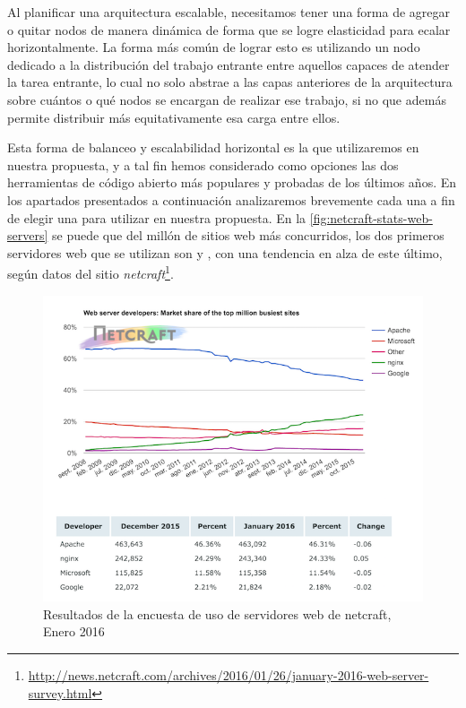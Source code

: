 Al planificar una arquitectura escalable, necesitamos tener una forma de agregar o quitar nodos de manera dinámica de forma que se logre elasticidad para ecalar horizontalmente. La forma más común de lograr esto es utilizando un nodo dedicado a la distribución del trabajo entrante entre aquellos capaces de atender la tarea entrante, lo cual no solo abstrae a las capas anteriores de la arquitectura sobre cuántos o qué nodos se encargan de realizar ese trabajo, si no que además permite distribuir más equitativamente esa carga entre ellos.

Esta forma de balanceo y escalabilidad horizontal es la que utilizaremos en nuestra propuesta, y a tal fin hemos considerado como opciones las dos herramientas de código abierto más populares y probadas de los últimos años. En los apartados presentados a continuación analizaremos brevemente cada una a fin de elegir una para utilizar en nuestra propuesta. En la \autoref{fig:netcraft-stats-web-servers} se puede que del millón de sitios web más concurridos, los dos primeros servidores web que se utilizan son  y , con una tendencia en alza de este último, según datos del sitio \textit{netcraft}\footnote{\url{http://news.netcraft.com/archives/2016/01/26/january-2016-web-server-survey.html}}.

\begin{figure}[H]
  \includegraphics[width=\linewidth]{src/images/03-capitulo-3/tecnologias/balanceo/stats.png}
  \caption{Resultados de la encuesta de uso de servidores web de netcraft, Enero 2016}
  \label{fig:netcraft-stats-web-servers}
\end{figure}
